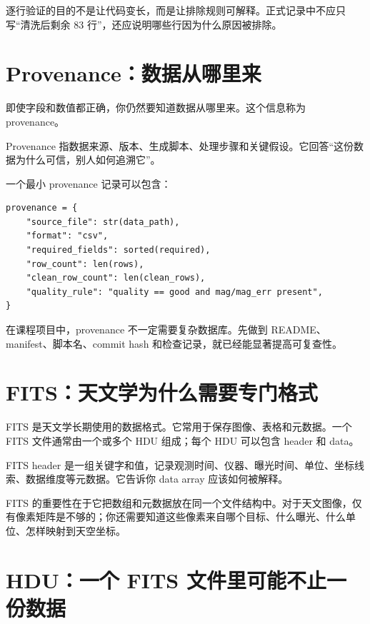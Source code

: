 逐行验证的目的不是让代码变长，而是让排除规则可解释。正式记录中不应只写“清洗后剩余 83 行”，还应说明哪些行因为什么原因被排除。

\section{Provenance：数据从哪里来}

即使字段和数值都正确，你仍然要知道数据从哪里来。这个信息称为 provenance。

\begin{defbox}[Provenance]
Provenance 指数据来源、版本、生成脚本、处理步骤和关键假设。它回答“这份数据为什么可信，别人如何追溯它”。
\end{defbox}

一个最小 provenance 记录可以包含：

\begin{examplebox}[最小 provenance 字典]
\begin{lstlisting}[style=pythonstyle]
provenance = {
    "source_file": str(data_path),
    "format": "csv",
    "required_fields": sorted(required),
    "row_count": len(rows),
    "clean_row_count": len(clean_rows),
    "quality_rule": "quality == good and mag/mag_err present",
}
\end{lstlisting}
\end{examplebox}

在课程项目中，provenance 不一定需要复杂数据库。先做到 README、manifest、脚本名、commit hash 和检查记录，就已经能显著提高可复查性。

\section{FITS：天文学为什么需要专门格式}

FITS 是天文学长期使用的数据格式。它常用于保存图像、表格和元数据。一个 FITS 文件通常由一个或多个 HDU 组成；每个 HDU 可以包含 header 和 data。

\begin{defbox}
FITS header 是一组关键字和值，记录观测时间、仪器、曝光时间、单位、坐标线索、数据维度等元数据。它告诉你 data array 应该如何被解释。
\end{defbox}

FITS 的重要性在于它把数组和元数据放在同一个文件结构中。对于天文图像，仅有像素矩阵是不够的；你还需要知道这些像素来自哪个目标、什么曝光、什么单位、怎样映射到天空坐标。

\section{HDU：一个 FITS 文件里可能不止一份数据}

